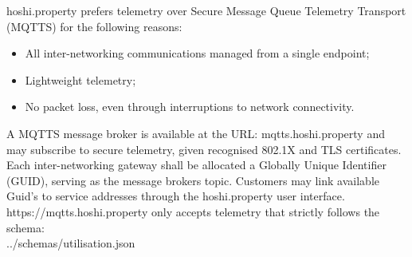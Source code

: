 \documentclass[11pt, oneside]{article}   	%
\begin{document}
hoshi.property prefers telemetry over Secure Message Queue Telemetry Transport (MQTTS) for the following reasons:
\begin{itemize}
\item All inter-networking communications managed from a single endpoint;
\item Lightweight telemetry;
\item No packet loss, even through interruptions to network connectivity.
\end{itemize}
A MQTTS message broker is available at the URL: mqtts.hoshi.property and may subscribe to secure telemetry, given recognised 802.1X and TLS certificates.
Each inter-networking gateway shall be allocated a Globally Unique Identifier (GUID), serving as the message brokers topic.
Customers may link available Guid's to service addresses through the hoshi.property user interface.\\

https://mqtts.hoshi.property only accepts telemetry that strictly follows the schema:\\

../schemas/utilisation.json\\
\end{document}
